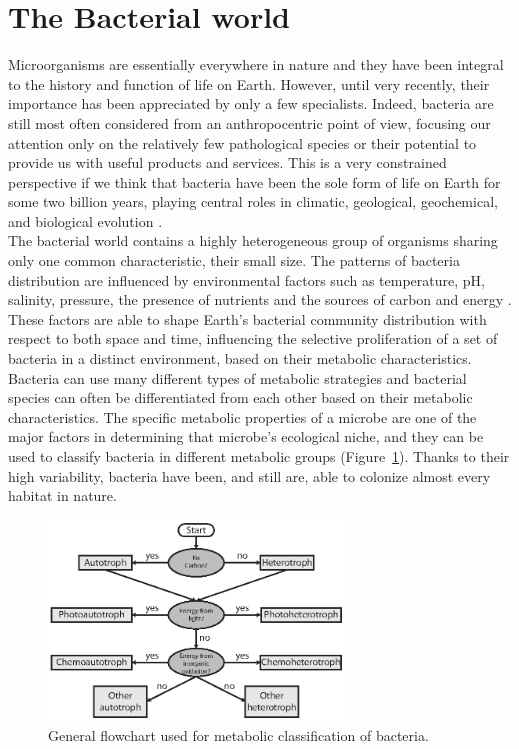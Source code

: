 \section{The Bacterial world}
Microorganisms are essentially everywhere in nature and they have been integral to the history and function of life on Earth. However, until very recently, their importance has been appreciated by only a few specialists. Indeed, bacteria are still most often considered from an anthropocentric point of view, focusing our attention only on the relatively few pathological species or their potential to provide us with useful products and services. This is a very constrained perspective if we think that bacteria have been the sole form of life on Earth for some two billion years, playing central roles in climatic, geological, geochemical, and biological evolution \cite{cavalier2006cell}.\\
The bacterial world contains a highly heterogeneous group of organisms sharing only one common characteristic, their small size. The patterns of bacteria distribution are influenced by environmental factors such as temperature, pH, salinity, pressure, the presence of nutrients and the sources of carbon and energy \citep{gerhard1986bacterial}. These factors are able to shape Earth's bacterial community distribution with respect to both space and time, influencing the selective proliferation of a set of bacteria in a distinct environment, based on their metabolic characteristics. Bacteria can use many different types of metabolic strategies and bacterial species can often be differentiated from each other based on their metabolic characteristics. The specific metabolic properties of a microbe are one of the major factors in determining that microbe’s ecological niche, and they can be used to classify bacteria in different metabolic groups (Figure~\ref{fig:bacmet}). Thanks to their high variability, bacteria have been, and still are, able to colonize almost every habitat in nature.\\
\begin{figure}[!tb]
	\centering
	\includegraphics[width=0.7\textwidth]{./figures/Introduction/bacterial_metabolism_bw}
  	\caption{General flowchart used for metabolic classification of bacteria. \label{fig:bacmet}}
\end{figure}
